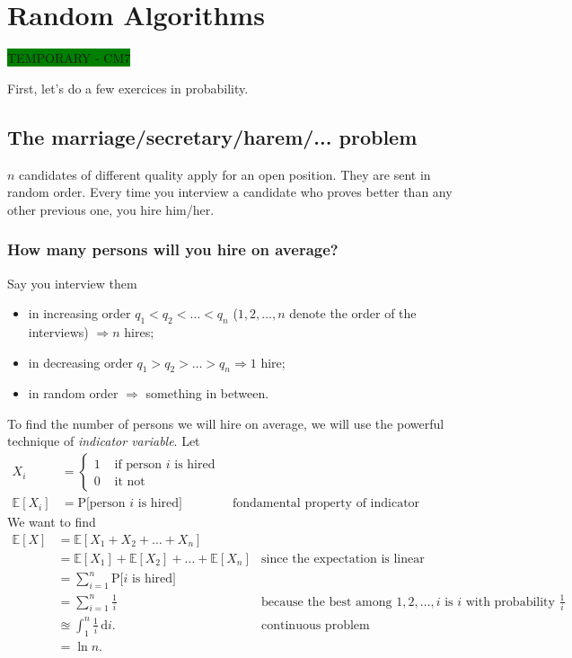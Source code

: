 \chapter{Random Algorithms}

\colorbox{green}{TEMPORARY - CM7}

First, let's do a few exercices in probability.

\section{The marriage/secretary/harem/... problem}
$n$ candidates of different quality apply for an open position. They are sent in random order. Every time you interview a candidate who proves better than any other previous one, you hire him/her.

\subsection{How many persons will you hire on average?}
Say you interview them 
\begin{itemize}
\item in increasing order $q_1 < q_2 < \ldots < q_n$ ($1,2, \ldots, n$ denote the order of the interviews) $\Rightarrow n$ hires;
\item in decreasing order $q_1 > q_2 > \ldots > q_n \Rightarrow 1$ hire;
\item in random order $\Rightarrow$ something in between.
\end{itemize}
To find the number of persons we will hire on average, we will use the powerful technique of \textit{indicator variable}. Let
\begin{align*}
X_i &=
  \left\{
      \begin{aligned}
      	1 &\text{ if person $i$ is hired} \\
        0 &\text{ it not }
      \end{aligned}
    \right.\\
\mathbb{E}[X_i] &= \text{P[person $i$ is hired}] &\text{ fondamental property of indicator variable}
\end{align*}
We want to find
\begin{align*}
\mathbb{E}[X] &=  \mathbb{E}[X_1+X_2+\ldots+X_n] & \\
&=  \mathbb{E}[X_1] + \mathbb{E}[X_2] + \ldots +\mathbb{E}[X_n]  &\text{since the expectation is linear}\\
&= \sum_{i=1}^n \text{P[$i$ is hired]} &\\
&= \sum_{i=1}^n \frac{1}{i} &\text{because the best among $1,2,\ldots,i$ is $i$ with probability $\frac{1}{i}$}\\
&\approxeq \int_1^n \frac{1}{i}  \, \mathrm{d}i. &\text{continuous problem}\\
&= \ln n. &
\end{align*}

